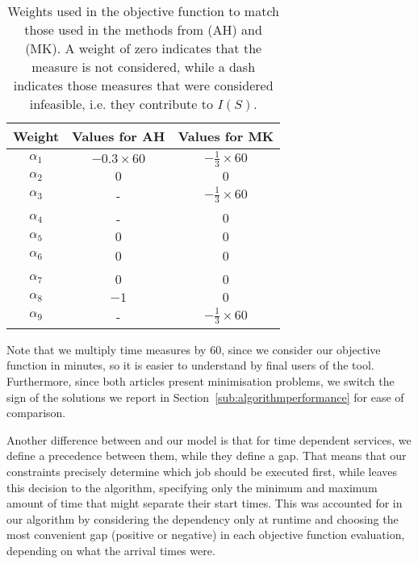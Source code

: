 \documentclass[a4paper,11pt,authoryear]{elsarticle}
\begin{document}
\begin{table}[htbp!]
    \centering
    \caption{Weights used in the objective function to match those used in the methods from  \citet{aithaddadene2016} (AH) and \citet{mankowska2014} (MK). A weight of zero indicates that the measure is not considered, while a dash indicates those measures that were considered infeasible, i.e. they contribute to $I(S)$.}
    \begin{tabular}{ccc}
    \toprule
    \textbf{Weight}  & \textbf{Values for AH} & \textbf{Values for MK} \\
    \midrule
    $\alpha_1$      &   $-0.3\times60$          &  $-\frac{1}{3}\times60$ \\
    $\alpha_2$      &   $0$                     &  $0$ \\
    $\alpha_3$      &   -                       &  $-\frac{1}{3}\times60$ \\
    $\alpha_4$      &   -                       &  $0$ \\   
    $\alpha_5$      &   $0$                     &  $0$ \\       
    $\alpha_6$      &   0                       &  0 \\    
    $\alpha_7$      &   0                       &  0 \\    
    $\alpha_8$      &   $-1$                    &  $0$ \\    
    $\alpha_9$      &   -                       &  $-\frac{1}{3}\times60$ \\    
    \bottomrule
    \end{tabular}
    \label{table:adaptedobjvalues}
\end{table}

\noindent Note that we multiply time measures by $60$, since we consider our objective function in minutes, so it is easier to understand by final users of the tool. Furthermore, since both articles present minimisation problems, we switch the sign of the solutions we report in Section~\ref{sub:algorithmperformance} for ease of comparison.

Another difference between \cite{aithaddadene2016} and our model is that for time dependent services, we define a precedence between them, while they define a gap. That means that our constraints precisely determine which job should be executed first, while \cite{aithaddadene2016} leaves this decision to the algorithm, specifying only the minimum and maximum amount of time that might separate their start times. This was accounted for in our algorithm by considering the dependency only at runtime and choosing the most convenient gap (positive or negative) in each objective function evaluation, depending on what the arrival times were.
\end{document}
